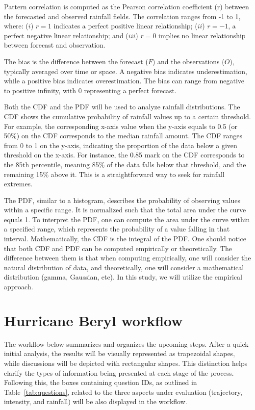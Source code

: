 Pattern correlation is computed as the Pearson correlation coefficient (r) between the forecasted and observed rainfall fields. The correlation ranges from -1 to 1, where: ($i$) $r = 1$ indicates a perfect positive linear relationship; ($ii$) $r = -1$, a perfect negative linear relationship; and ($iii$) $r = 0$ implies no linear relationship between forecast and observation.

The bias is the difference between the forecast ($F$) and the observations ($O$), typically averaged over time or space. A negative bias indicates underestimation, while a positive bias indicates overestimation. The bias can range from negative to positive infinity, with 0 representing a perfect forecast.

Both the CDF and the PDF will be used to analyze rainfall distributions. The CDF shows the cumulative probability of rainfall values up to a certain threshold. For example, the corresponding x-axis value when the y-axis equals to 0.5 (or 50\%) on the CDF corresponds to the median rainfall amount. The CDF ranges from 0 to 1 on the y-axis, indicating the proportion of the data below a given threshold on the x-axis. For instance, the 0.85 mark on the CDF corresponds to the 85th percentile, meaning 85\% of the data falls below that threshold, and the remaining 15\% above it. This is a straightforward way to seek for rainfall extremes.

The PDF, similar to a histogram, describes the probability of observing values within a specific range. It is normalized such that the total area under the curve equals 1. To interpret the PDF, one can compute the area under the curve within a specified range, which represents the probability of a value falling in that interval. Mathematically, the CDF is the integral of the PDF. One should notice that both CDF and PDF can be computed empirically or theoretically. The difference between them is that when computing empirically, one will consider the natural distribution of data, and theoretically, one will consider a mathematical distribution (gamma, Gaussian, etc). In this study, we will utilize the empirical approach.



\section{Hurricane Beryl workflow}

The workflow below summarizes and organizes the upcoming steps. After a quick initial analysis, the results will be visually represented as trapezoidal shapes, while discussions will be depicted with rectangular shapes. This distinction helps clarify the types of information being presented at each stage of the process. Following this, the boxes containing question IDs, as outlined in Table~\ref{tab:questions}, related to the three aspects under evaluation (trajectory, intensity, and rainfall) will be also displayed in the workflow.

